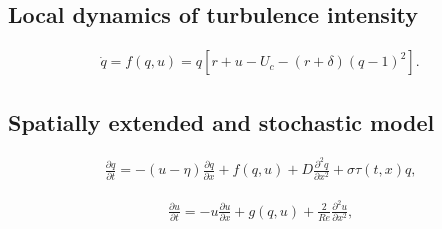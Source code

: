 \documentclass{article}
\begin{document}
\subsection{Local dynamics of turbulence intensity}
\begin{align}
\dot{q}=f\left(q,u\right)=q \left[r+u-U_{c}-\left(r+\delta \right) \left(q -1 \right)^{2} \right]\text{.}
\label{eq:loc_q}
\end{align}





\subsection{Spatially extended and stochastic model}
\begin{align}
\frac{\partial q}{\partial t}=-\left(u-\eta \right)\frac{\partial q}{\partial x} + f\left(q,u \right) + D\frac{\partial^{2} q}{\partial x^{2}} + \sigma \tau \left(t,x\right) q \text{,}
\label{eq:SPDE_q}
\end{align}

\begin{align}
\frac{\partial u}{\partial t}=-u\frac{\partial u}{\partial x} + g\left(q,u \right) + \frac{2}{Re}\frac{\partial^{2} u}{\partial x^{2}} \text{,}
\label{eq:PDE_u}
\end{align}




\end{document}
